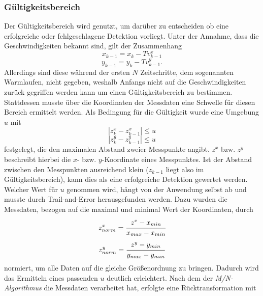 \documentclass[10pt,a4paper]{article}
\begin{document}
\subsubsection{Gültigkeitsbereich}
	Der Gültigkeitsbereich wird genutzt, um darüber zu entscheiden ob eine erfolgreiche oder fehlgeschlagene Detektion vorliegt. Unter der Annahme, dass die Geschwindigkeiten bekannt sind, gilt der Zusammenhang
	\begin{equation}
		x_{k-1}=x_k-Tv^x_{k-1}
	\end{equation}
	\begin{equation*}
		y_{k-1}=y_k-Tv^y_{k-1}.
	\end{equation*}
	\newline
	Allerdings sind diese während der ersten $N$ Zeitschritte, dem sogenannten Warmlaufen, nicht gegeben, weshalb Anfangs nicht auf die Geschwindigkeiten zurück gegriffen werden kann um einen Gültigkeitsbereich zu bestimmen. Stattdessen musste über die Koordinaten der Messdaten eine Schwelle für diesen Bereich ermittelt werden. Als Bedingung für die Gültigkeit wurde eine Umgebung $u$ mit
	\begin{equation}
		|z^x_k-z^x_{k-1}|\leq u
	\end{equation}
	\begin{equation*}
		|z^y_k-z^y_{k-1}|\leq u
	\end{equation*}
	\newline
	festgelegt, die den maximalen Abstand zweier Messpunkte angibt. $z^x$ bzw. $z^y$ beschreibt hierbei die $x$- bzw. $y$-Koordinate eines Messpunktes. Ist der Abstand zwischen den Messpunkten ausreichend klein ($z_{k-1}$ liegt also im Gültigkeitsbereich), kann dies als eine erfolgreiche Detektion gewertet werden. Welcher Wert für $u$ genommen wird, hängt von der Anwendung selbst ab und musste durch Trail-and-Error herausgefunden werden. Dazu wurden die Messdaten, bezogen auf die maximal und minimal Wert der Koordinaten, durch
	\begin{equation}
		z^x_{norm}=\cfrac{z^x-x_{min}}{x_{max}-x_{min}}
	\end{equation}
	\begin{equation*}
		z^y_{norm}=\cfrac{z^y-y_{min}}{y_{max}-y_{min}}
	\end{equation*}
	\newline
	normiert, um alle Daten auf die gleiche Größenordnung zu bringen. Dadurch wird das Ermitteln eines passenden $u$ deutlich erleichtert. Nach dem der \textit{M/N-Algorithmus} die Messdaten verarbeitet hat, erfolgte eine Rücktransformation mit
\end{document}
